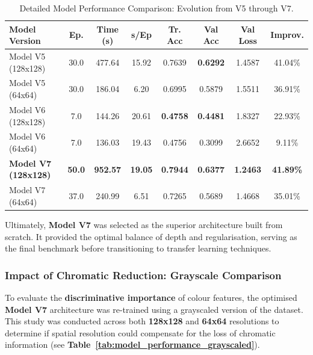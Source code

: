 \documentclass[a4paper,11pt]{article}
\begin{document}
\begin{table}[h]
\centering
\small %
\setlength{\tabcolsep}{3pt} %
\caption{Detailed Model Performance Comparison: Evolution from V5 through V7.}
\label{tab:model_v5_v6_v7}
\begin{tabular}{|l|c|c|c|c|c|c|c|}
\hline
\textbf{Model Version} & \textbf{Ep.} & \textbf{Time (s)} & \textbf{s/Ep} & \textbf{Tr. Acc} & \textbf{Val Acc} & \textbf{Val Loss} & \textbf{Improv.} \\ \hline
Model V5 (128x128)     & 30.0 & 477.64 & 15.92 & 0.7639 & \textbf{0.6292} & 1.4587 & 41.04\% \\ \hline
Model V5 (64x64)       & 30.0 & 186.04 & 6.20  & 0.6995 & 0.5879 & 1.5511 & 36.91\% \\ \hline
Model V6 (128x128)     & 7.0  & 144.26 & 20.61 & \textbf{0.4758} & \textbf{0.4481} & 1.8327 & 22.93\% \\ \hline
Model V6 (64x64)       & 7.0  & 136.03 & 19.43 & 0.4756 & 0.3099 & 2.6652 & 9.11\%  \\ \hline
\textbf{Model V7 (128x128)} & \textbf{50.0} & \textbf{952.57} & \textbf{19.05} & \textbf{0.7944} & \textbf{0.6377} & \textbf{1.2463} & \textbf{41.89\%} \\ \hline
Model V7 (64x64)       & 37.0 & 240.99 & 6.51  & 0.7265 & 0.5689 & 1.4668 & 35.01\% \\ \hline
\end{tabular}
\end{table}

Ultimately, \textbf{Model V7} was selected as the superior architecture built from scratch. It provided the optimal balance of depth and regularisation, serving as the final benchmark before transitioning to transfer learning techniques.

\subsubsection{Impact of Chromatic Reduction: Grayscale Comparison}

To evaluate the \textbf{discriminative importance} of colour features, the optimised \textbf{Model V7} architecture was re-trained using a grayscaled version of the dataset. This study was conducted across both \textbf{128x128} and \textbf{64x64} resolutions to determine if spatial resolution could compensate for the loss of chromatic information (see \textbf{Table~\ref{tab:model_performance_grayscaled}}). 
\end{document}
